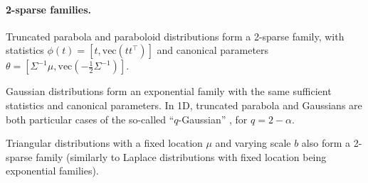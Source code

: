 \documentclass{article}
\newcommand{\remove}[1]{}
\begin{document}
\paragraph{2-sparse families.} 
Truncated parabola and paraboloid distributions form a 2-sparse family, with statistics $\phi(t) = [t, \mathrm{vec}(tt^\top)]$ and  canonical parameters $\theta = [\Sigma^{-1}\mu, \mathrm{vec}(-\frac{1}{2}\Sigma^{-1})]$. 
\remove{
From (\ref{eq:sparsemax}--\ref{eq:truncated_parabola}):
\begin{equation*}
    A_2(\theta) = -\frac{1}{2}\left(\frac{3}{2\sigma}\right)^{2/3} + \frac{\mu^2}{2\sigma^2} + 1 =  -\frac{\theta_1^2}{4\theta_2} + \left(\frac{9\theta_2}{16}\right)^{1/3} + 1.
\end{equation*}
Contrast this expression with the one for Gaussian distributions, which form an exponential family with the same sufficient statistics and canonical parameters, for which $A_1(\theta) = -\frac{\theta_1^2}{4\theta_2} - \frac{1}{2}\log(-2\theta_2)$.
}
Gaussian distributions form an exponential family with the same sufficient statistics and canonical parameters. 
In 1D, truncated parabola and Gaussians are both particular cases of the so-called ``$q$-Gaussian'' \citep[\S 4.1]{naudts2009q}, for $q = 2-\alpha$. 
\remove{Fig.~\ref{fig:gaussian_laplacian_distributions} (right) shows $(2-\alpha)$-Gaussian distributions for $\alpha \in [1,2]$.}
Triangular distributions with a fixed location $\mu$ and varying scale $b$ also form a 2-sparse family (similarly to Laplace distributions with fixed location being exponential families).

\begin{comment}
\begin{wrapfigure}{r}{0.45\columnwidth}
\centering
\texttt{[image: figures/sparse\_distributions]}
\caption{{\bf Location-scale families with different $\alpha$-Tsallis regularizations.} Left: Gaussian and truncated parabola distributions with zero mean and different variances. Middle: same for Laplace and triangular distributions. Right: Distributions $\hat{p}_{\Omega_\alpha}[-t^2/2]$ for varying $\alpha$. \label{fig:gaussian_laplacian_distributions}}
\end{wrapfigure}
\end{comment}
\end{document}
